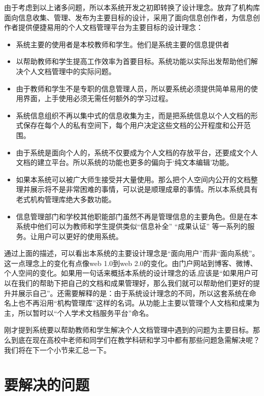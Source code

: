 由于考虑到以上诸多问题，所以本系统开发之初即转换了设计理念。放弃了机构库面向信息收集、管理、发布为主要目标的设计，采用了面向信息创作者，为信息创作者提供便捷易用的个人文档管理平台为主要目标的设计理念：
\begin{itemize}
\item 系统主要的使用者是本校教师和学生。他们是系统主要的信息提供者
\item 以帮助教师和学生提高工作效率为首要目标。系统功能以实际出发帮助他们解决个人文档管理中的实际问题。
\item 由于教师和学生不是专职的信息管理人员，所以要系统必须提供简单易用的使用界面，上手使用必须无需任何额外的学习过程。
\item 系统信息组织不再以集中式的信息收集为主，而是把系统信息以个人文档的形式保存在每个人的私有空间下，每个用户决定这些文档的公开程度和公开范围。
\item 由于系统是面向个人的，系统不仅要成为个人文档的存放平台，还要成文个人文档的建立平台。所以系统的功能也更多的偏向于‘纯文本编辑’功能。
\item 如果本系统可以被广大师生接受并大量使用。那么把个人空间内公开的文档整理并展示将不是非常困难的事情，可以说是顺理成章的事情。所以本系统具有老式机构管理库绝大多数功能。
\item 信息管理部门和学校其他职能部门虽然不再是管理信息的主要角色。但是在本系统中他们可以为教师和学生提供类似“信息补全” “成果认证” 等一系列的服务。让用户可以更好的使用系统。
\end{itemize}
通过上面的描述，可以看出本系统的主要设计理念是“面向用户”而非“面向系统”。这一点理念上的变化有点像web 1.0到web 2.0的变化。由门户网站到博客、微博、个人空间的变化。如果用一句话来概括本系统的设计理念的话,应该是“如果用户可以在我们的帮助下把自己的文档和成果管理好，那么我们就可以帮助他们更好的提升并展示自己”。还需要解释的是：由于系统设计理念的不同，所以这套系统在命名上也不再沿用“机构管理库”这样的名词。从功能上主要以管理个人文档和成果为主，所以暂时以“个人学术文档服务平台”命名。

刚才提到系统要以帮助教师和学生解决个人文档管理中遇到的问题为主要目标。那么到底在现在高校中老师和同学们在教学科研和学习中都有那些问题急需解决呢？我们将在下一个小节来汇总一下。

\section{要解决的问题}
\label{sec:question}

